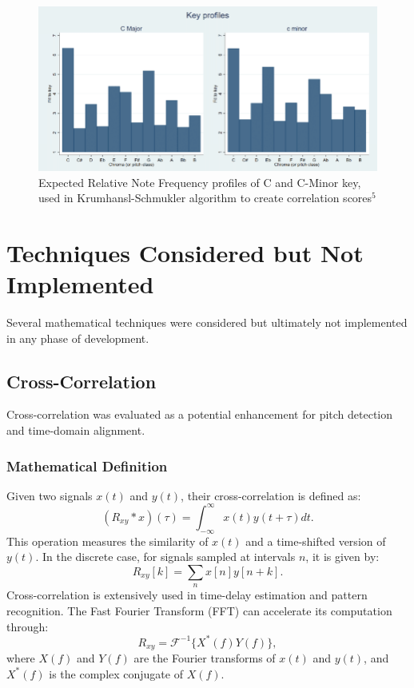 \documentclass{article}
\begin{document}
\begin{figure}[h]
\includegraphics[width=125mm,scale=0.5]{docs/LiteratureReview/images/C-Cminor-Expected-Key-Profiles.png}
\caption{Expected Relative Note Frequency profiles of C and C-Minor key, used in Krumhansl-Schmukler algorithm to create correlation scores$^5$}
\end{figure}

\newpage

\section{Techniques Considered but Not Implemented}
Several mathematical techniques were considered but ultimately not implemented in any phase of development.

\subsection{Cross-Correlation}
Cross-correlation was evaluated as a potential enhancement for pitch detection and time-domain alignment.

\subsubsection{Mathematical Definition}
Given two signals $x(t)$ and $y(t)$, their cross-correlation is defined as:
\begin{equation}
(R_{xy} \ast x)(\tau) = \int_{-\infty}^{\infty} x(t) y(t + \tau) dt.
\end{equation}
This operation measures the similarity of $x(t)$ and a time-shifted version of $y(t)$. In the discrete case, for signals sampled at intervals $n$, it is given by:
\begin{equation}
R_{xy}[k] = \sum_{n} x[n] y[n+k].
\end{equation}
Cross-correlation is extensively used in time-delay estimation and pattern recognition. The Fast Fourier Transform (FFT) can accelerate its computation through:
\begin{equation}
R_{xy} = \mathcal{F}^{-1} \{ X^*(f) Y(f) \},
\end{equation}
where $X(f)$ and $Y(f)$ are the Fourier transforms of $x(t)$ and $y(t)$, and $X^*(f)$ is the complex conjugate of $X(f)$. \\
\end{document}

